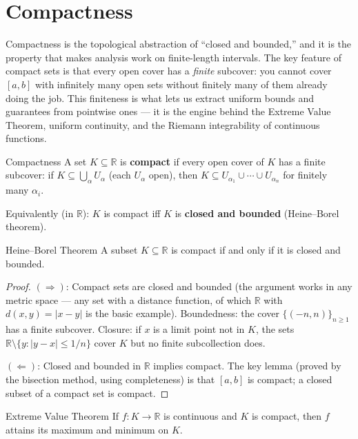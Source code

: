 \documentclass[12pt, openany]{book}
\theoremstyle{plain}
\theoremstyle{definition}
\theoremstyle{remark}
\newcommand{\R}{\mathbb{R}}
\begin{document}
\section{Compactness}

Compactness is the topological abstraction of ``closed and bounded,'' and it is the property that makes analysis work on finite-length intervals.  The key feature of compact sets is that every open cover has a \emph{finite} subcover: you cannot cover $[a,b]$ with infinitely many open sets without finitely many of them already doing the job.  This finiteness is what lets us extract uniform bounds and guarantees from pointwise ones --- it is the engine behind the Extreme Value Theorem, uniform continuity, and the Riemann integrability of continuous functions.

\begin{defbox}{Compactness}
A set $K \subseteq \R$ is \textbf{compact} if every open cover of $K$ has a finite subcover:
if $K \subseteq \bigcup_{\alpha} U_\alpha$ (each $U_\alpha$ open), then $K \subseteq U_{\alpha_1} \cup \cdots \cup U_{\alpha_n}$ for finitely many $\alpha_i$.

Equivalently (in $\R$): $K$ is compact iff $K$ is \textbf{closed and bounded} (Heine--Borel theorem).
\end{defbox}
\color{black}

\begin{thmbox}{Heine--Borel Theorem}
A subset $K \subseteq \R$ is compact if and only if it is closed and bounded.
\end{thmbox}
\color{black}

\begin{proof}
$(\Rightarrow)$: Compact sets are closed and bounded (the argument works in any metric space --- any set with a distance function, of which $\R$ with $d(x,y) = |x-y|$ is the basic example). Boundedness: the cover $\{(-n,n)\}_{n\geq 1}$ has a finite subcover. Closure: if $x$ is a limit point not in $K$, the sets $\R \setminus \{y : |y-x| \leq 1/n\}$ cover $K$ but no finite subcollection does.

$(\Leftarrow)$: Closed and bounded in $\R$ implies compact. The key lemma (proved by the bisection method, using completeness) is that $[a,b]$ is compact; a closed subset of a compact set is compact.
\end{proof}

\begin{thmbox}{Extreme Value Theorem}
If $f : K \to \R$ is continuous and $K$ is compact, then $f$ attains its maximum and minimum on $K$.
\end{thmbox}
\color{black}
\end{document}
